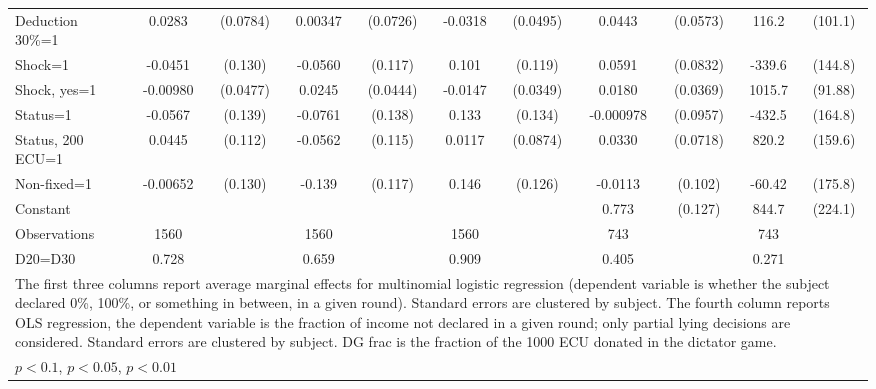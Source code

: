 \begin{tabular}{l|cccccc|cc|cc}
Deduction 30\%=1&   0.0283         & (0.0784)&  0.00347         & (0.0726)&  -0.0318         & (0.0495)&   0.0443         & (0.0573)&    116.2         &  (101.1)\\
Shock=1         &  -0.0451         &  (0.130)&  -0.0560         &  (0.117)&    0.101         &  (0.119)&   0.0591         & (0.0832)&   -339.6\sym{**} &  (144.8)\\
Shock, yes=1    & -0.00980         & (0.0477)&   0.0245         & (0.0444)&  -0.0147         & (0.0349)&   0.0180         & (0.0369)&   1015.7\sym{***}&  (91.88)\\
Status=1        &  -0.0567         &  (0.139)&  -0.0761         &  (0.138)&    0.133         &  (0.134)&-0.000978         & (0.0957)&   -432.5\sym{***}&  (164.8)\\
Status, 200 ECU=1&   0.0445         &  (0.112)&  -0.0562         &  (0.115)&   0.0117         & (0.0874)&   0.0330         & (0.0718)&    820.2\sym{***}&  (159.6)\\
Non-fixed=1     & -0.00652         &  (0.130)&   -0.139         &  (0.117)&    0.146         &  (0.126)&  -0.0113         &  (0.102)&   -60.42         &  (175.8)\\
Constant        &                  &         &                  &         &                  &         &    0.773\sym{***}&  (0.127)&    844.7\sym{***}&  (224.1)\\
\hline
Observations    &     1560         &         &     1560         &         &     1560         &         &      743         &         &      743         &         \\
D20=D30         &    0.728         &         &    0.659         &         &    0.909         &         &    0.405         &         &    0.271         &         \\
\hline\hline
\multicolumn{11}{p{18cm}}{\tiny The first three columns report average marginal effects for multinomial logistic regression (dependent variable is whether the subject declared 0\%,  100\%, or something in between, in a given round). Standard errors are clustered by subject. The fourth column reports OLS regression, the dependent variable is the fraction of income not declared in a given round; only partial lying decisions are considered. Standard errors are clustered by subject. DG frac is the fraction of the 1000 ECU donated in the dictator game.}\\
\multicolumn{11}{l}{\tiny \sym{*} \(p<0.1\), \sym{**} \(p<0.05\), \sym{***} \(p<0.01\)}\\
\end{tabular}